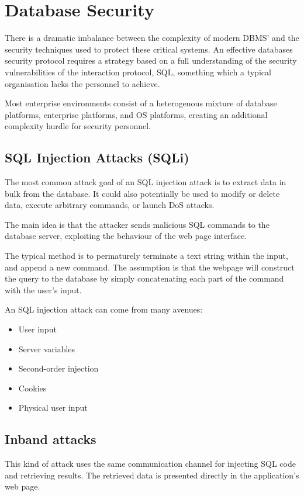 \section{Database Security}
There is a dramatic imbalance between the complexity of modern DBMS' and 
the security techniques used to protect these critical systems. An effective
databases security protocol requires a strategy based on a full understanding
of the security vulnerabilities of the interaction protocol, SQL, something which
a typical organisation lacks the personnel to achieve.

Most enterprise environments consist of a heterogenous mixture of database platforms,
enterprise platforms, and OS platforms, creating an additional complexity hurdle
for security personnel.

\subsection{SQL Injection Attacks (SQLi)}
The most common attack goal of an SQL injection attack is to extract data in
bulk from the database. It could also potentially be used to modify or delete data,
execute arbitrary commands, or launch DoS attacks.

The main idea is that the attacker sends malicious SQL commands to the database server,
exploiting the behaviour of the web page interface.

The typical method is to permaturely terminate a text string within the input,
and append a new command. The assumption is that the webpage will construct the query
to the database by simply concatenating each part of the command with the user's input.

An SQL injection attack can come from many avenues:
\begin{itemize}
    \item User input
    \item Server variables
    \item Second-order injection
    \item Cookies
    \item Physical user input
\end{itemize}

\subsection{Inband attacks}
This kind of attack uses the same communication channel for injecting SQL code and
retrieving results. The retrieved data is presented directly in the application's
web page.

